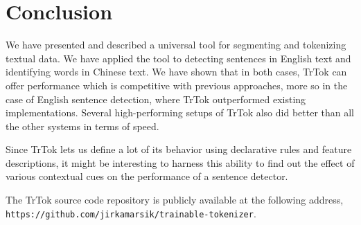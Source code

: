 \section{Conclusion}
\label{sec:outro}

We have presented and described a universal tool for segmenting and
tokenizing textual data. We have applied the tool to detecting
sentences in English text and identifying words in Chinese text. We
have shown that in both cases, TrTok can offer performance which is
competitive with previous approaches, more so in the case of English
sentence detection, where TrTok outperformed existing implementations.
Several high-performing setups of TrTok also did better than all the
other systems in terms of speed.

Since TrTok lets us define a lot of its behavior using declarative
rules and feature descriptions, it might be interesting to harness
this ability to find out the effect of various contextual cues on the
performance of a sentence detector.

The TrTok source code repository is publicly available at the
following address, \\
\texttt{https://github.com/jirkamarsik/trainable-tokenizer}.
